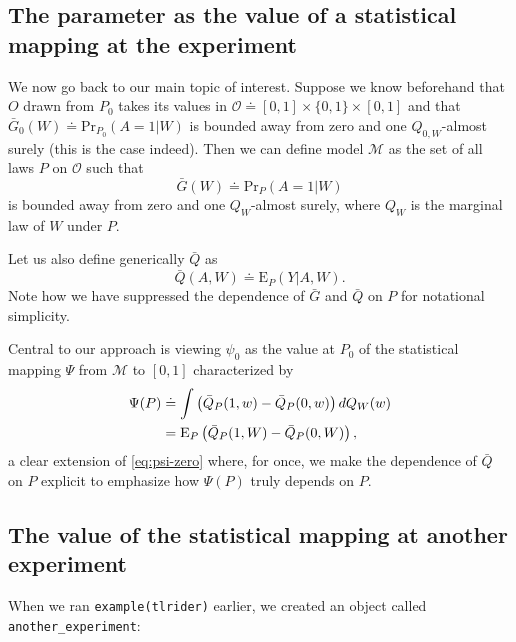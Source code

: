 \documentclass[11pt,openright,twoside]{book}
\newcommand{\defq}{\doteq}
\newcommand{\calM}{\mathcal{M}}
\newcommand{\calO}{\mathcal{O}}
\newcommand{\Exp}{\textrm{E}}
\newcommand{\Gbar}{\bar{G}}
\renewcommand{\Pr}{\textrm{Pr}}
\newcommand{\Qbar}{\bar{Q}}
\theoremstyle{definition}
\theoremstyle{definition}
\theoremstyle{definition}
\theoremstyle{remark}
\begin{document}
\hypertarget{parameter-mapping}{%
\subsection{The parameter as the value of a statistical mapping at the experiment}\label{parameter-mapping}}

We now go back to our main topic of interest. Suppose we know beforehand that
\(O\) drawn from \(P_{0}\) takes its values in \(\calO \defq [0,1] \times \{0,1\} \times [0,1]\) and that \(\Gbar_{0}(W) \defq \Pr_{P_{0}}(A=1|W)\) is bounded away from
zero and one \(Q_{0,W}\)-almost surely (this is the case indeed). Then we can
define model \(\calM\) as the set of all laws \(P\) on \(\calO\) such that
\begin{equation*}\Gbar(W)  \defq \Pr_{P}(A=1|W)\end{equation*} is bounded away
from zero and one \(Q_{W}\)-almost surely, where \(Q_{W}\) is the marginal law of
\(W\) under \(P\).

Let us also define generically \(\Qbar\) as \begin{equation*}\Qbar (A,W) \defq
\Exp_{P} (Y|A, W).\end{equation*} Note how we have suppressed the dependence
of \(\Gbar\) and \(\Qbar\) on \(P\) for notational simplicity.

Central to our approach is viewing \(\psi_{0}\) as the value at \(P_{0}\) of the
statistical mapping \(\Psi\) from \(\calM\) to \([0,1]\) characterized by
\begin{align}  \Psi(P)  &\defq  \int  \left(\Qbar_P(1,  w)  -  \Qbar_P(0,
w)\right)  dQ_{W}(w)   \label{eq:psimap}\\  &=  \Exp_{P}  \left(\Qbar_P(1,   W)  -
\Qbar_P(0,   W)\right),    \notag   \end{align} a clear extension of
\eqref{eq:psi-zero} where, for once, we make the dependence of \(\Qbar\) on \(P\)
explicit to emphasize how \(\Psi(P)\) truly depends on \(P\).

\hypertarget{value-another-experiment}{%
\subsection{The value of the statistical mapping at another experiment}\label{value-another-experiment}}

When we ran \texttt{example(tlrider)} earlier, we created an object called
\texttt{another\_experiment}:
\end{document}
